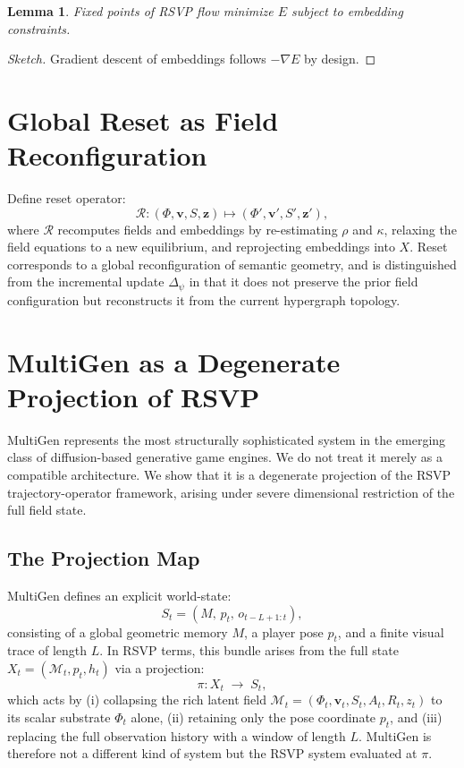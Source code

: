 \documentclass[11pt]{article}
\newtheorem{lemma}[theorem]{Lemma}
\begin{document}
\begin{lemma}
Fixed points of RSVP flow minimize $E$ subject to embedding constraints.
\end{lemma}

\begin{proof}[Sketch]
Gradient descent of embeddings follows $-\nabla E$ by design.
\end{proof}

\section{Global Reset as Field Reconfiguration}

Define reset operator:
\[
\mathcal{R}: (\Phi,\mathbf{v},S,\mathbf{z})\mapsto
(\Phi',\mathbf{v}',S',\mathbf{z}'),
\]
where $\mathcal{R}$ recomputes fields and embeddings by re-estimating
$\rho$ and $\kappa$, relaxing the field equations to a new equilibrium,
and reprojecting embeddings into $X$.
Reset corresponds to a global reconfiguration of semantic geometry,
and is distinguished from the incremental update $\Delta_\psi$ in that
it does not preserve the prior field configuration but reconstructs it
from the current hypergraph topology.

\section{MultiGen as a Degenerate Projection of RSVP}
\label{sec:multigen}

MultiGen \cite{po2026multigen} represents the most structurally
sophisticated system in the emerging class of diffusion-based generative
game engines.
We do not treat it merely as a compatible architecture.
We show that it is a degenerate projection of the RSVP trajectory-operator
framework, arising under severe dimensional restriction of the full field
state.

\subsection{The Projection Map}

MultiGen defines an explicit world-state:
\[
S_t = (M,\, p_t,\, o_{t-L+1:t}),
\]
consisting of a global geometric memory $M$, a player pose $p_t$, and a
finite visual trace of length $L$.
In RSVP terms, this bundle arises from the full state
$X_t = (\mathcal{M}_t, p_t, h_t)$ via a projection:
\[
\pi : X_t \;\longrightarrow\; S_t,
\]
which acts by (i) collapsing the rich latent field
$\mathcal{M}_t = (\Phi_t, \mathbf{v}_t, S_t, A_t, R_t, z_t)$ to its
scalar substrate $\Phi_t$ alone, (ii) retaining only the pose coordinate
$p_t$, and (iii) replacing the full observation history with a window of
length $L$.
MultiGen is therefore not a different kind of system but the RSVP system
evaluated at $\pi$.
\end{document}

